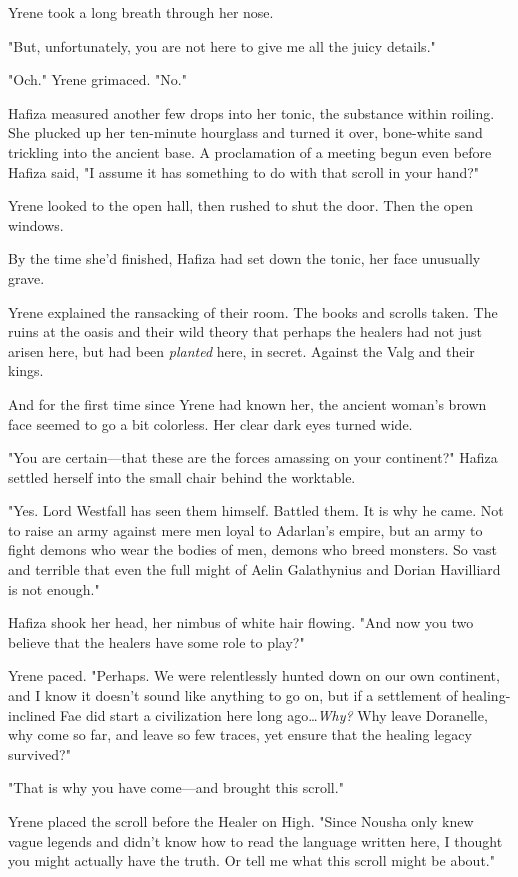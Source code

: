 Yrene took a long breath through her nose.

"But, unfortunately, you are not here to give me all the juicy details."

"Och."
Yrene grimaced.
"No."

Hafiza measured another few drops into her tonic, the substance within roiling.
She plucked up her ten-minute hourglass and turned it over, bone-white sand trickling into the ancient base.
A proclamation of a meeting begun even before Hafiza said, "I assume it has something to do with that scroll in your hand?"

Yrene looked to the open hall, then rushed to shut the door.
Then the open windows.

By the time she'd finished, Hafiza had set down the tonic, her face unusually grave.

Yrene explained the ransacking of their room.
The books and scrolls taken.
The ruins at the oasis and their wild theory that perhaps the healers had not just arisen here, but had been \emph{planted} here, in secret.
Against the Valg and their kings.

And for the first time since Yrene had known her, the ancient woman's brown face seemed to go a bit colorless.
Her clear dark eyes turned wide.

"You are certain---that these are the forces amassing on your continent?"
Hafiza settled herself into the small chair behind the worktable.

"Yes.
Lord Westfall has seen them himself.
Battled them.
It is why he came.
Not to raise an army against mere men loyal to Adarlan's empire, but an army to fight demons who wear the bodies of men, demons who breed monsters.
So vast and terrible that even the full might of Aelin Galathynius and Dorian Havilliard is not enough."

Hafiza shook her head, her nimbus of white hair flowing.
"And now you two believe that the healers have some role to play?"

Yrene paced.
"Perhaps.
We were relentlessly hunted down on our own continent, and I know it doesn't sound like anything to go on, but if a settlement of healing-inclined Fae did start a civilization here long ago\ldots \emph{Why?} Why leave Doranelle, why come so far, and leave so few traces, yet ensure that the healing legacy survived?"

"That is why you have come---and brought this scroll."

Yrene placed the scroll before the Healer on High.
"Since Nousha only knew vague legends and didn't know how to read the language written here, I thought you might actually have the truth.
Or tell me what this scroll might be about."

